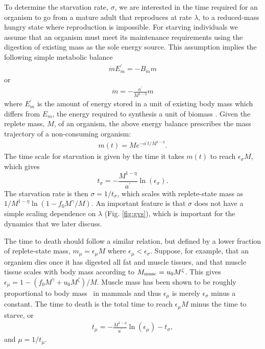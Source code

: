 \documentclass{pnastwo}
\begin{document}
\begin{article}
To determine the starvation rate, $\sigma$, we are interested in the time
required for an organism to go from a mature adult that reproduces at rate
$\lambda$, to a
reduced-mass hungry state where reproduction is impossible.  For starving individuals we assume that an organism must meet its maintenance requirements using the digestion of existing mass as the sole energy source.
This assumption implies the following simple metabolic balance
\begin{eqnarray}
\dot{m}E_{m}^{\prime}=-B_{m}m
\end{eqnarray}
or
\begin{eqnarray}
\dot{m}=-\frac{a^{\prime}}{M^{1-\eta}}m
\end{eqnarray}
where $E_{m}^{\prime}$ is the amount of energy stored in a unit of existing
body mass which differs from $E_{m}$, the energy required to
synthesis a unit of biomass \cite{hou}. Given the replete mass, $M$, of an organism, the
above energy balance prescribes the mass trajectory of a non-consuming
organism:
\begin{eqnarray}
\label{mt}
m\left(t\right)=Me^{-a^{\prime}t/M^{1-\eta}}.
\end{eqnarray}
The time scale for starvation is
given by the time it takes $m(t)$ to reach $\epsilon_{\sigma} M$, which gives
\begin{equation}
\label{eq:sigma}
t_{\sigma}=-\frac{M^{1-\eta}}{a^{\prime}}\ln\left(\epsilon_{\sigma}\right).
\end{equation}
The starvation rate is then $\sigma=1/t_{\sigma}$, which scales with
replete-state mass as $1/M^{1-\eta}\ln\left(1-f_{0}M^{\gamma}/M\right)$.  An important
feature is that $\sigma$ does not have a simple scaling dependence on
$\lambda$ (Fig. \ref{fig:gvs}), which is important for the dynamics that we
later discuss.

The time to death should follow a similar relation, but defined by a lower
fraction of replete-state mass, $m_{\mu}=\epsilon_{\mu} M$ where $\epsilon_\mu < \epsilon_\sigma$.
Suppose, for example, that an organism dies once it has digested all fat and
muscle tissues, and that muscle tissue scales with body mass according to
$M_{\rm musc}=u_{0}M^{\zeta}$.  This gives
$\epsilon_{\mu}=1-\left(f_{0}M^{\gamma}+u_{0}M^{\zeta}\right)/M$. Muscle
mass has been shown to be roughly proportional to body mass~\cite{Folland:2008ij} in
mammals and thus $\epsilon_{\mu}$ is merely $\epsilon_{\sigma}$ minus a constant. The time to death is the total time to reach $\epsilon_{\mu}M$ minus the time to starve, or
\begin{eqnarray}
t_{\mu}=-\frac{M^{1-\eta}}{a^{\prime}}\ln\left(\epsilon_{\mu}\right)-t_{\sigma},
\end{eqnarray}
and $\mu=1/t_{\mu}$.


\end{article}
\end{document}
